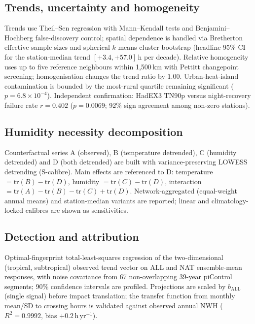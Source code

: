 \documentclass[12pt,a4paper]{article}
\begin{document}
\subsection*{Trends, uncertainty and homogeneity}
Trends use Theil--Sen regression with Mann--Kendall tests and Benjamini--Hochberg false-discovery
control; spatial dependence is handled via Bretherton effective sample sizes and spherical
$k$-means cluster bootstrap (headline 95\% CI for the station-median trend $[+3.4,+57.0]$\,h per
decade). Relative homogeneity uses up to five reference neighbours within 1,500\,km with Pettitt
changepoint screening; homogenisation changes the trend ratio by $1.00$. Urban-heat-island
contamination is bounded by the most-rural quartile remaining significant ($p=6.8\times10^{-4}$).
Independent confirmation: HadEX3 TN90p versus night-recovery failure rate $r=0.402$
($p=0.0069$; 92\% sign agreement among non-zero stations).

\subsection*{Humidity necessity decomposition}
Counterfactual series A (observed), B (temperature detrended), C (humidity detrended) and D (both
detrended) are built with variance-preserving LOWESS detrending (S-calibre). Main effects are
referenced to D: temperature $=\mathrm{tr}(B)-\mathrm{tr}(D)$, humidity
$=\mathrm{tr}(C)-\mathrm{tr}(D)$, interaction
$=\mathrm{tr}(A)-\mathrm{tr}(B)-\mathrm{tr}(C)+\mathrm{tr}(D)$. Network-aggregated (equal-weight
annual means) and station-median variants are reported; linear and climatology-locked calibres are
shown as sensitivities.

\subsection*{Detection and attribution}
Optimal-fingerprint total-least-squares regression of the two-dimensional (tropical, subtropical)
observed trend vector on ALL and NAT ensemble-mean responses, with noise covariance from 67
non-overlapping 39-year piControl segments; 90\% confidence intervals are profiled. Projections are
scaled by $b_\mathrm{ALL}$ (single signal) before impact translation; the transfer function from
monthly mean/SD to crossing hours is validated against observed annual $\mathrm{NWH}$
($R^2=0.9992$, bias $+0.2$\,h\,yr$^{-1}$).
\end{document}
